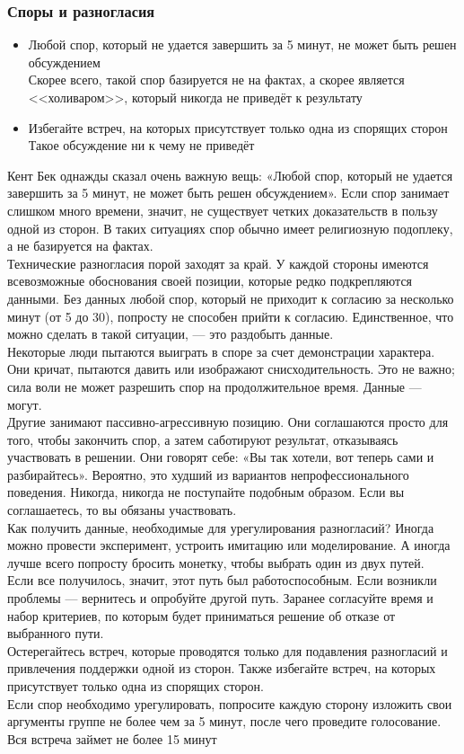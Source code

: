 \documentclass{../industrial-development}
\begin{document}
\begin{frame} \frametitle{Споры и разногласия}
\begin{itemize}
  \item Любой спор, который не удается завершить за 5 минут, не может быть решен обсуждением\\
	Скорее всего, такой спор базируется не на фактах, а скорее является <<холиваром>>, который никогда не приведёт к результату
  \item Избегайте встреч, на которых присутствует только одна из спорящих сторон\\
	Такое обсуждение ни к чему не приведёт
\end{itemize}
\end{frame}
\lecturenotes
Кент Бек однажды сказал очень важную вещь: «Любой спор, который не удается завершить за 5 минут, не может быть решен обсуждением». Если спор занимает слишком много времени, значит, не существует четких доказательств в пользу одной из сторон. В таких ситуациях спор обычно имеет религиозную подоплеку, а не базируется на фактах.\\
Технические разногласия порой заходят за край. У каждой стороны имеются всевозможные обоснования своей позиции, которые редко подкрепляются данными. Без данных любой спор, который не приходит к согласию за несколько минут (от 5 до 30), попросту не способен прийти к согласию. Единственное, что можно сделать в такой ситуации, — это раздобыть данные.\\
Некоторые люди пытаются выиграть в споре за счет демонстрации характера. Они кричат, пытаются давить или изображают снисходительность. Это не важно; сила воли не может разрешить спор на продолжительное время. Данные — могут.\\
Другие занимают пассивно-агрессивную позицию. Они соглашаются просто для того, чтобы закончить спор, а затем саботируют результат, отказываясь участвовать в решении. Они говорят себе: «Вы так хотели, вот теперь сами и разбирайтесь». Вероятно, это худший из вариантов непрофессионального поведения. Никогда, никогда не поступайте подобным образом. Если вы соглашаетесь, то вы обязаны участвовать.\\
Как получить данные, необходимые для урегулирования разногласий? Иногда можно провести эксперимент, устроить имитацию или моделирование. А иногда лучше всего попросту бросить монетку, чтобы выбрать один из двух путей.\\
Если все получилось, значит, этот путь был работоспособным. Если возникли проблемы — вернитесь и опробуйте другой путь. Заранее согласуйте время и набор критериев, по которым будет приниматься
решение об отказе от выбранного пути.\\
Остерегайтесь встреч, которые проводятся только для подавления разногласий и привлечения поддержки одной из сторон. Также избегайте встреч, на которых присутствует только одна из спорящих сторон.\\
Если спор необходимо урегулировать, попросите каждую сторону изложить свои аргументы группе не более чем за 5 минут, после чего проведите голосование. Вся встреча займет не более 15 минут
\end{document}
